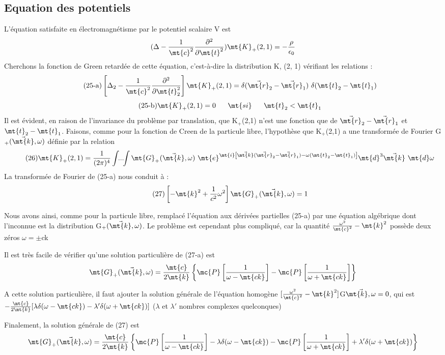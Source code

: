 \subsection{Equation des potentiels}%

L'équation satisfaite en électromagnétisme par le potentiel
scalaire V est
\[
(\Delta-\frac{1}{\mt{c}^2}\frac{\partial^2}{\partial\mt{t}^2})\mt{K}_+(2,1)=-\frac{\rho}{\epsilon_0}
\]
Cherchons la fonction de Green retardée de cette équation, c'est-à-dire
la distribution K, (2, 1) vérifiant les relations :
\[
\tag{25-a}\left[\Delta_2-\frac{1}{\mt{c}^2}\frac{\partial^2}{\partial\mt{t}_2^2}\right]\mt{K}_+(2,1)=
\delta(\vec{\mt{r}}_2-\vec{\mt{r}}_1)\ \delta(\mt{t}_2-\mt{t}_1)
\]
\[
\tag{25-b}\mt{K}_+(2,1)=0\ \ \ \ \ \mt{si}\ \ \ \ \ \mt{t}_2<\mt{t}_1
\]
Il est évident, en raison de l'invariance du problème par translation, que
K$_+$(2,1) n'est une fonction que de $\vec{\mt{r}}_2-\vec{\mt{r}}_1$ et $\mt{t}_2-\mt{t}_1$. Faisons, comme pour
la fonction de Creen de la particule libre, l'hypothèse que K$_+$(2,1) a une
transformée de Fourier G$_+(\vec{\mt{k}},\omega)$ définie par la relation
\[
\tag{26}\mt{K}_+(2,1)=\frac{1}{(2\pi)^4}\int\!\!...\!\!\int \mt{G}_+(\vec{\mt{k}},\omega)
\ \mt{e}^{\mt{i}\left[\vec{\mt{k}}(\vec{\mt{r}}_2-\vec{\mt{r}}_1)-\omega(\mt{t}_2-\mt{t}_1)\right]}
\mt{d}^3\vec{\mt{k}}\ \mt{d}\omega
\]
La transformée de Fourier de (25-a) nous conduit à : 
\[
\tag{27}\left[-\mt{k}^2+\frac{1}{c^2}\omega^2\right]\mt{G}_+(\vec{\mt{k}},\omega)=1
\]
 
Nous avons ainsi, comme pour la particule libre, remplacé
l'équation aux dérivées partielles (25-a) par une équation algébrique
dont l'inconnue est la distribution G$_+(\vec{\mt{k}},\omega)$. Le problème est cependant
plus compliqué, car la quantité $\frac{\omega^2}{\mt{c}^2}-\mt{k}^2$ possède deux zéros $\omega=\pm$ck

Il est très facile de vérifier qu'une solution particulière
de (27-a) est
\[
\mt{G}_+(\vec{\mt{k}},\omega)=
\frac{\mt{c}}{2\mt{k}}\left\{\mc{P}\left[\frac{1}{\omega-\mt{ck}}\right]-\mc{P}\left[\frac{1}{\omega+\mt{ck}}\right]\right\}
\]

A cette solution particulière, il faut ajouter la solution générale de
l'équation homogène $[\frac{\omega^2}{\mt{c}^2}-\mt{k}^2]$G$\vec{\mt{k},\omega}=0$, qui est $-\frac{\mt{c}}{2\mt{k}}[\lambda\delta(\omega-\mt{ck})-\lambda'\delta(\omega+\mt{ck})]$ ($\lambda$ et $\lambda'$
 nombres complexes quelconques)

Finalement, la solution générale de (27) est
\[
\mt{G}_+(\vec{\mt{k}},\omega)=
\frac{\mt{c}}{2\mt{k}}\left\{\mc{P}\left[\frac{1}{\omega-\mt{ck}}\right]-\lambda\delta(\omega-\mt{ck})-\mc{P}\left[\frac{1}{\omega+\mt{ck}}\right]+\lambda'\delta(\omega+\mt{ck})\right\}
\]

